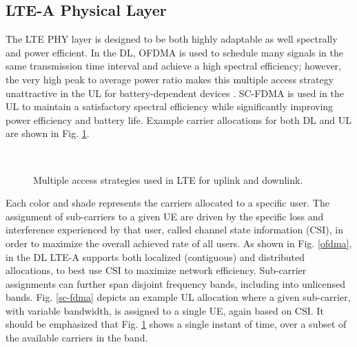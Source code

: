 \subsection{\mbox{LTE-A} Physical Layer}
\label{lte-phy}
The LTE PHY layer is designed to be both highly adaptable as well spectrally and power efficient.  In the DL, OFDMA is used to schedule many signals in the same transmission time interval and achieve a high spectral efficiency; however, the very high peak to average power ratio makes this multiple access strategy unattractive in the UL for battery-dependent devices \cite{tr36201}\cite{tr36211}.  SC-FDMA is used in the UL to maintain a satisfactory spectral efficiency while significantly improving power efficiency and battery life. Example carrier allocations for both DL and UL are shown in Fig. \ref{lte:of-sc-fdma}.
\begin{figure}[!ht] 	
	\\
	\caption{Multiple access strategies used in LTE for uplink and downlink.}
	\label{lte:of-sc-fdma}
\end{figure}
Each color and shade represents the carriers allocated to a specific user.  The assignment of sub-carriers to a given UE are driven by the specific loss and interference experienced by that user, called channel state information (CSI), in order to maximize the overall achieved rate of all users.  As shown in Fig. \ref{ofdma}, in the DL \mbox{LTE-A} supports both localized (contiguous) and distributed allocations, to best use CSI to maximize network efficiency. Sub-carrier assignments can further span disjoint frequency bands, including into unlicensed bands.  Fig. \ref{sc-fdma} depicts an example UL allocation where a given sub-carrier, with variable bandwidth, is assigned to a single UE, again based on CSI.  It should be emphasized that Fig. \ref{lte:of-sc-fdma} shows a single instant of time, over a subset of the available carriers in the band.

